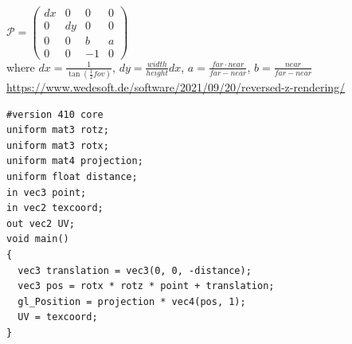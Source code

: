 \documentclass[calcdimensions,landscape,letterpaper]{powersem}
\newcommand{\thecurrentheading}{}
\newcommand{\heading}[1]{\renewcommand{\thecurrentheading}{#1}}
\begin{document}
\begin{slide}
\begin{center}
\begin{minipage}[c]{.45\textwidth}
        \end{minipage}\vspace{-16pt}\\
        $\mathcal{P}=
         \begin{pmatrix}
            dx & 0  &  0 & 0\\
            0  & dy &  0 & 0\\
            0  & 0  &  b & a\\
            0  & 0  & -1 & 0
        \end{pmatrix}$\medskip\\
        where
        $dx=\frac{1}{\tan(\frac{1}{2}fov)}$,
        $dy=\frac{width}{height}dx$,
        $a=\frac{far\cdot near}{far-near}$,
        $b=\frac{near}{far-near}$\bigskip\\
        \url{https://www.wedesoft.de/software/2021/09/20/reversed-z-rendering/}
    \end{center}
\end{slide}

\begin{slide}
    \heading{3D: Shader with Translation and Projection}
    \begin{center}
        \begin{minipage}[c]{.65\textwidth}
            \begin{verbatim}
#version 410 core
uniform mat3 rotz;
uniform mat3 rotx;
uniform mat4 projection;
uniform float distance;
in vec3 point;
in vec2 texcoord;
out vec2 UV;
void main()
{
  vec3 translation = vec3(0, 0, -distance);
  vec3 pos = rotx * rotz * point + translation;
  gl_Position = projection * vec4(pos, 1);
  UV = texcoord;
}
            \end{verbatim}
        \end{minipage}
    \end{center}
\end{slide}
\end{document}
